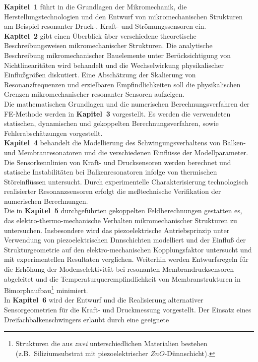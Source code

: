 {\bf Kapitel~1} führt in die Grundlagen der Mikromechanik, die
Herstellungstechnologien und den Entwurf von mikromechanischen Strukturen
am Beispiel resonanter Druck-, Kraft- und Strömungssensoren ein.\\
%
{\bf Kapitel~2} gibt einen Überblick über verschiedene theoretische
Beschreibungsweisen mikro\-mechanischer Strukturen. Die analytische
Beschreibung mikromechanischer Bauelemente unter Berücksichtigung von
Nichtlinearitäten wird behandelt und die Wechselwirkung
physikalischer Einflußgrößen diskutiert. Eine Abschätzung der Skalierung
von Resonanzfrequenzen und erzielbaren Empfindlichkeiten soll die
physikalischen Grenzen mikromechanischer resonanter Sensoren aufzeigen.\\
%
Die mathematischen Grundlagen und die numerischen Berechnungsverfahren der
FE-Methode werden in {\bf Kapitel~3} vorgestellt. Es werden die verwendeten
statischen, dynamischen und gekoppelten Berechnungsverfahren, sowie
Fehlerabschätzungen vorgestellt.\\ %
%
{\bf Kapitel~4} behandelt die Modellierung des
Schwingungsverhaltens von Balken- und Membranresonatoren und die
verschiedenen Einflüsse der Modellparameter. Die Sensorkenn\-linien
von Kraft- und Drucksensoren werden berechnet und statische
Instabilitäten bei Balkenresonatoren infolge von thermischen
Störeinflüssen untersucht. Durch experimentelle Charakterisierung
technologisch realisierter Resonanzsensoren erfolgt die meßtechnische
Verifikation der numerischen Berechnungen.\\
%
Die in {\bf Kapitel~5} durchgeführten gekoppelten Feldberechnungen gestatten
es, das elektro-thermo-mechanische Verhalten mikromechanischer Strukturen zu
untersuchen. Insbesondere wird das piezoelektrische Antriebs\-prinzip unter
Verwendung von piezoelektrischen Dnnschichten modelliert und der Einfluß
der Strukturgeometrie auf den elektro-mechanischen Kopplungsfaktor untersucht
und mit experimentellen Resultaten verglichen.
Weiterhin werden Entwurfsregeln für die Erhöhung der Modenselektivität bei
resonanten Membrandrucksensoren abgeleitet und die
Temperaturquerempfindlichkeit von Membranstrukturen in
Bimorphaufbau\footnote{Strukturen die aus {\em zwei} unterschiedlichen
Materialien bestehen (z.B.\ Siliziumsubstrat mit piezoelektrischer
$ZnO$-Dünnschicht).} minimiert.\\
%
In {\bf Kapitel~6} wird der Entwurf und die Realisierung alternativer
Sensorgeometrien für die Kraft- und Druckmessung vorgestellt.
Der Einsatz eines Dreifachbalkenschwingers erlaubt durch eine geeignete
